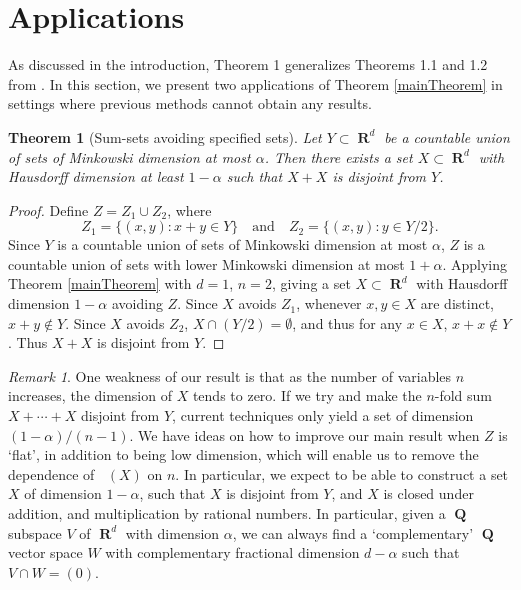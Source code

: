 \documentclass[dvipsnames,letterpaper,12pt]{article}
\numberwithin{equation}{section}
\theoremstyle{plain}
\newtheorem{theorem}{Theorem}
\theoremstyle{remark}
\newtheorem*{remark}{Remark}
\DeclareMathOperator{\hausdim}{\dim_{\mathbf{H}}}
\DeclareMathOperator{\RR}{\mathbf{R}}
\DeclareMathOperator{\QQ}{\mathbf{Q}}
\begin{document}
\section{Applications}\label{applications}

As discussed in the introduction, Theorem 1 generalizes Theorems 1.1 and 1.2 from \cite{MalabikaRob}. In this section, we present two applications of Theorem \ref{mainTheorem} in settings where previous methods cannot obtain any results.

\begin{theorem}[Sum-sets avoiding specified sets]
	Let $Y \subset \RR^d$ be a countable union of sets of Minkowski dimension at most $\alpha$. Then there exists a set $X \subset \RR^d$ with Hausdorff dimension at least $1 - \alpha$ such that $X + X$ is disjoint from $Y$.
\end{theorem}
\begin{proof}
	Define $Z = Z_1 \cup Z_2$, where
	\[ Z_1 = \{ (x,y) : x + y \in Y \} \quad \text{and} \quad Z_2 = \{ (x,y): y \in Y/2 \}. \]
	Since $Y$ is a countable union of sets of Minkowski dimension at most $\alpha$, $Z$ is a countable union of sets with lower Minkowski dimension at most $1 + \alpha$. Applying Theorem \ref{mainTheorem} with $d = 1$, $n = 2$, giving a set $X \subset \RR^d$ with Hausdorff dimension $1 - \alpha$ avoiding $Z$. Since $X$ avoids $Z_1$, whenever $x,y \in X$ are distinct, $x + y \not \in Y$. Since $X$ avoids $Z_2$, $X \cap (Y/2) = \emptyset$, and thus for any $x \in X$, $x + x \not \in Y$. Thus $X + X$ is disjoint from $Y$.
\end{proof}

\begin{remark}
	One weakness of our result is that as the number of variables $n$ increases, the dimension of $X$ tends to zero. If we try and make the $n$-fold sum $X + \cdots + X$ disjoint from $Y$, current techniques only yield a set of dimension $(1 - \alpha)/(n-1)$. We have ideas on how to improve our main result when $Z$ is `flat', in addition to being low dimension, which will enable us to remove the dependence of $\hausdim(X)$ on $n$. In particular, we expect to be able to construct a set $X$ of dimension $1 - \alpha$, such that $X$ is disjoint from $Y$, and $X$ is closed under addition, and multiplication by rational numbers. In particular, given a $\QQ$ subspace $V$ of $\RR^d$ with dimension $\alpha$, we can always find a `complementary' $\QQ$ vector space $W$ with complementary fractional dimension $d - \alpha$ such that $V \cap W = (0)$.
\end{remark}
\end{document}
